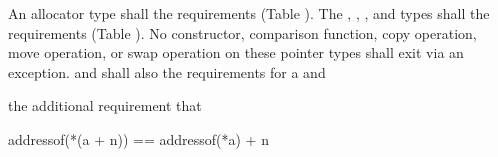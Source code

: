 \setcounter{Paras}{4}
\pnum
An allocator type  shall  the
 requirements (Table ).
The , , , and
 types shall  the
 requirements (Table ).
No constructor,
comparison function, copy operation, move operation, or swap operation on
these pointer types shall exit via an exception.  and  shall also
 the requirements for
a 
 and
\begin{addedblock}
the additional requirement that
\begin{codeblock}
addressof(*(a + n)) == addressof(*a) + n
\end{codeblock}
\end{addedblock}
